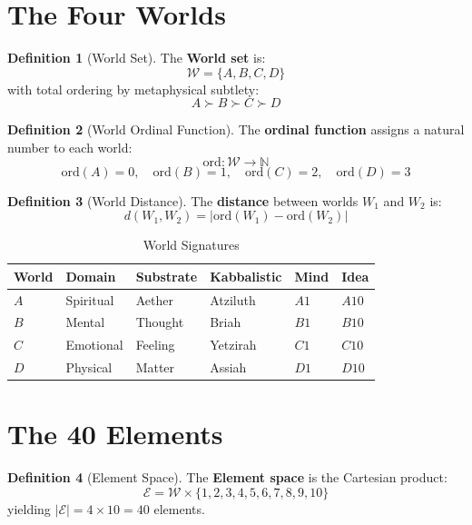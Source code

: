 \documentclass[11pt,twoside,openright]{book}
\theoremstyle{definition}
\newtheorem{definition}{Definition}[chapter]
\theoremstyle{plain}
\theoremstyle{remark}
\newcommand{\Worlds}{\mathcal{W}}
\newcommand{\Elements}{\mathcal{E}}
\newcommand{\ord}{\mathrm{ord}}
\begin{document}
\section{The Four Worlds}

\begin{definition}[World Set]
\label{def:world-set}
The \textbf{World set} is:
\[
\Worlds = \{A, B, C, D\}
\]
with total ordering by metaphysical subtlety:
\[
A \succ B \succ C \succ D
\]
\end{definition}

\begin{definition}[World Ordinal Function]
\label{def:world-ord}
The \textbf{ordinal function} assigns a natural number to each world:
\[
\ord : \Worlds \to \mathbb{N}
\]
\[
\ord(A) = 0, \quad \ord(B) = 1, \quad \ord(C) = 2, \quad \ord(D) = 3
\]
\end{definition}

\begin{definition}[World Distance]
\label{def:world-distance}
The \textbf{distance} between worlds $W_1$ and $W_2$ is:
\[
d(W_1, W_2) = |\ord(W_1) - \ord(W_2)|
\]
\end{definition}

\begin{table}[h]
\centering
\caption{World Signatures}
\label{tab:world-signatures}
\begin{tabular}{llllll}
\toprule
\textbf{World} & \textbf{Domain} & \textbf{Substrate} & \textbf{Kabbalistic} & \textbf{Mind} & \textbf{Idea} \\
\midrule
$A$ & Spiritual & Aether & Atziluth & $A1$ & $A10$ \\
$B$ & Mental & Thought & Briah & $B1$ & $B10$ \\
$C$ & Emotional & Feeling & Yetzirah & $C1$ & $C10$ \\
$D$ & Physical & Matter & Assiah & $D1$ & $D10$ \\
\bottomrule
\end{tabular}
\end{table}

\section{The 40 Elements}

\begin{definition}[Element Space]
\label{def:element-space}
The \textbf{Element space} is the Cartesian product:
\[
\Elements = \Worlds \times \{1, 2, 3, 4, 5, 6, 7, 8, 9, 10\}
\]
yielding $|\Elements| = 4 \times 10 = 40$ elements.
\end{definition}
\end{document}

